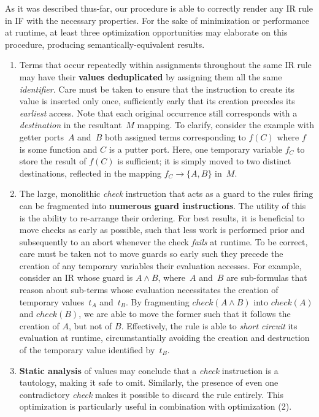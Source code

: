 As it was described thus-far, our procedure is able to correctly render any IR rule in IF with the necessary properties. For the sake of minimization or performance at runtime, at least three optimization opportunities may elaborate on this procedure, producing semantically-equivalent results.

\begin{enumerate}
	\item Terms that occur repeatedly within assignments throughout the same IR rule may have their \textbf{values deduplicated} by assigning them all the same \textit{identifier}. Care must be taken to ensure that the instruction to create its value is inserted only once, sufficiently early that its creation precedes its \textit{earliest} access. Note that each original occurrence still corresponds with a \textit{destination} in the resultant~$M$ mapping. To clarify, consider the example with getter ports~$A$ and~$B$ both assigned terms corresponding to $f(C)$ where $f$ is some function and $C$ is a putter port. Here, one temporary variable $f_C$ to store the result of $f(C)$ is sufficient; it is simply moved to two distinct destinations, reflected in the mapping $f_C\rightarrow\{A,B\}$ in~$M$.
	
	\item The large, monolithic \textit{check} instruction that acts as a guard to the rules firing can be fragmented into \textbf{numerous guard instructions}. The utility of this is the ability to re-arrange their ordering. For best results, it is beneficial to move checks as early as possible, such that less work is performed prior and subsequently to an abort whenever the check \textit{fails} at runtime. To be correct, care must be taken not to move guards so early such they precede the creation of any temporary variables their evaluation accesses. For example, consider an IR 
	whose guard is $A\wedge{}B$, where~$A$ and~$B$ are sub-formulas that reason about sub-terms whose evaluation necessitates the creation of temporary values~$t_A$ and~$t_B$. By fragmenting $check(A\wedge{}B)$ into $check(A)$ and $check(B)$, we are able to move the former such that it follows the creation of $A$, but not of $B$. Effectively, the rule is able to \textit{short circuit} its evaluation at runtime, circumstantially avoiding the creation and destruction of the temporary value identified by~$t_B$.
	
	\item \textbf{Static analysis} of values may conclude that a \textit{check} instruction is a tautology, making it safe to omit. Similarly, the presence of even one contradictory \textit{check} makes it possible to discard the rule entirely. This optimization is particularly useful in combination with optimization (2).
\end{enumerate}

